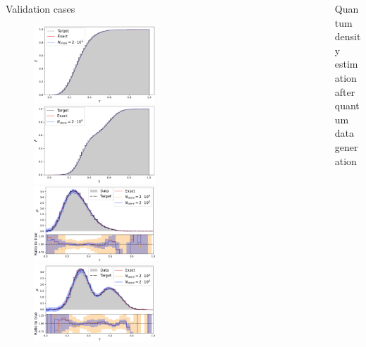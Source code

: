 \documentclass[20pt, final]{beamer}
\newlength{\sepwidth}
\newlength{\colwidth}
\newcommand{\separatorcolumn}{\begin{column}{\sepwidth}\end{column}}
\begin{document}
\begin{frame}[t]
\begin{columns}[t]
\begin{column}{\colwidth}
\begin{block}{Validation cases}
    \begin{figure}
    \includegraphics[width=0.5\textwidth]{figures/gamma_cdf.pdf}%
    \includegraphics[width=0.5\textwidth]{figures/gauss_cdf.pdf}
    \includegraphics[width=0.5\textwidth]{figures/gamma_pdf.pdf}%
    \includegraphics[width=0.5\textwidth]{figures/gauss_pdf.pdf}
    \end{figure}

  \end{block}

\end{column}

\separatorcolumn

\begin{column}{\colwidth}

  \begin{block}{Quantum density estimation after quantum data generation}


\end{block}
\end{column}
\end{columns}
\end{frame}
\end{document}
